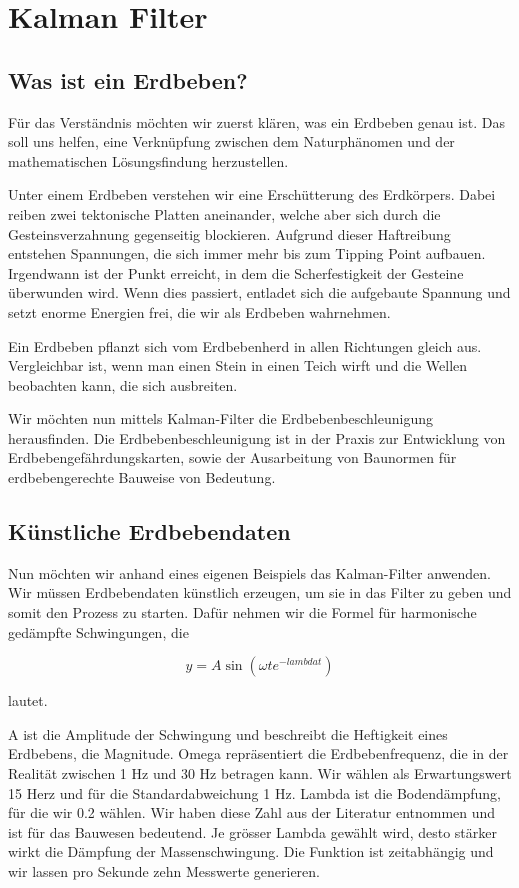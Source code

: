 \section{Kalman Filter}
\subsection{Was ist ein Erdbeben?}
Für das Verständnis möchten wir zuerst klären, was ein Erdbeben genau ist.
Das soll uns helfen, eine Verknüpfung zwischen dem Naturphänomen und der mathematischen Lösungsfindung herzustellen.

Unter einem Erdbeben verstehen wir eine Erschütterung des Erdkörpers.
Dabei reiben zwei tektonische Platten aneinander, welche aber sich durch die Gesteinsverzahnung gegenseitig blockieren.
Aufgrund dieser Haftreibung entstehen Spannungen, die sich immer mehr bis zum Tipping Point aufbauen.
Irgendwann ist der Punkt erreicht, in dem die Scherfestigkeit der Gesteine überwunden wird.
Wenn dies passiert, entladet sich die aufgebaute Spannung und setzt enorme Energien frei, die wir als Erdbeben wahrnehmen.

Ein Erdbeben pflanzt sich vom Erdbebenherd in allen Richtungen gleich aus.
Vergleichbar ist, wenn man einen Stein in einen Teich wirft und die Wellen beobachten kann, die sich ausbreiten.

Wir möchten nun mittels Kalman-Filter die Erdbebenbeschleunigung herausfinden.
Die Erdbebenbeschleunigung ist in der Praxis zur Entwicklung von Erdbebengefährdungskarten, sowie der Ausarbeitung von Baunormen für erdbebengerechte Bauweise von Bedeutung.


\subsection{Künstliche Erdbebendaten}
Nun möchten wir anhand eines eigenen Beispiels das Kalman-Filter anwenden.
Wir müssen Erdbebendaten künstlich erzeugen, um sie in das Filter zu geben und somit den Prozess zu starten.
Dafür nehmen wir die Formel für harmonische gedämpfte Schwingungen, die

\begin{equation}
	y = A \sin(\omega t e^{-lambda t})
\end{equation} 

lautet.




A ist die Amplitude der Schwingung und beschreibt die Heftigkeit eines Erdbebens, die Magnitude.
Omega repräsentiert die Erdbebenfrequenz, die in der Realität zwischen 1 Hz und 30 Hz betragen kann.
Wir wählen als Erwartungswert 15 Herz und für die Standardabweichung 1 Hz.
Lambda ist die Bodendämpfung, für die wir 0.2 wählen.
Wir haben diese Zahl aus der Literatur entnommen und ist für das Bauwesen bedeutend.
Je grösser Lambda gewählt wird, desto stärker wirkt die Dämpfung der Massenschwingung.
Die Funktion ist zeitabhängig und wir lassen pro Sekunde zehn Messwerte generieren.

